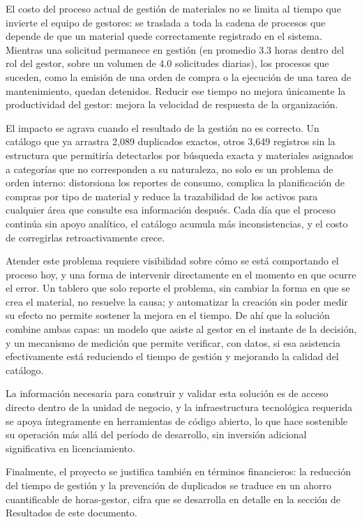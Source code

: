 El costo del proceso actual de gestión de materiales no se limita al tiempo que invierte el equipo de gestores: se traslada a toda la cadena de procesos que depende de que un material quede correctamente registrado en el sistema. Mientras una solicitud permanece en gestión (en promedio 3.3 horas dentro del rol del gestor, sobre un volumen de 4.0 solicitudes diarias), los procesos que suceden, como la emisión de una orden de compra o la ejecución de una tarea de mantenimiento, quedan detenidos. Reducir ese tiempo no mejora únicamente la productividad del gestor: mejora la velocidad de respuesta de la organización.

El impacto se agrava cuando el resultado de la gestión no es correcto. Un catálogo que ya arrastra 2,089 duplicados exactos, otros 3,649 registros sin la estructura que permitiría detectarlos por búsqueda exacta y materiales asignados a categorías que no corresponden a su naturaleza, no solo es un problema de orden interno: distorsiona los reportes de consumo, complica la planificación de compras por tipo de material y reduce la trazabilidad de los activos para cualquier área que consulte esa información después. Cada día que el proceso continúa sin apoyo analítico, el catálogo acumula más inconsistencias, y el costo de corregirlas retroactivamente crece.

Atender este problema requiere visibilidad sobre cómo se está comportando el proceso hoy, y una forma de intervenir directamente en el momento en que ocurre el error. Un tablero que solo reporte el problema, sin cambiar la forma en que se crea el material, no resuelve la causa; y automatizar la creación sin poder medir su efecto no permite sostener la mejora en el tiempo. De ahí que la solución combine ambas capas: un modelo que asiste al gestor en el instante de la decisión, y un mecanismo de medición que permite verificar, con datos, si esa asistencia efectivamente está reduciendo el tiempo de gestión y mejorando la calidad del catálogo.

La información necesaria para construir y validar esta solución es de acceso directo dentro de la unidad de negocio, y la infraestructura tecnológica requerida se apoya íntegramente en herramientas de código abierto, lo que hace sostenible su operación más allá del período de desarrollo, sin inversión adicional significativa en licenciamiento.

Finalmente, el proyecto se justifica también en términos financieros: la reducción del tiempo de gestión y la prevención de duplicados se traduce en un ahorro cuantificable de horas-gestor, cifra que se desarrolla en detalle en la sección de Resultados de este documento.